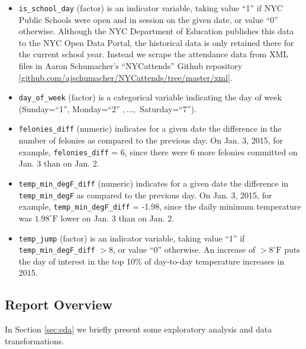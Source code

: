 \documentclass[11pt,notitlepage]{article}
\newcommand{\degf}{^\circ\text{F}}
\begin{document}
\begin{itemize}
\item \texttt{is_school_day} (factor) is an indicator variable, taking value ``1'' if NYC Public Schools were open and in session on the given date, or value ``0'' otherwise. Although the NYC Department of Education publishes this data to the NYC Open Data Portal, the historical data is only retained there for the current school year. Instead we scrape the attendance data from XML files in Aaron Schumacher's ``NYCattends'' Github repository [\href{https://github.com/ajschumacher/NYCattends/tree/master/xml}{github.com/ajschumacher/NYCattends/tree/master/xml}].


\item \texttt{day_of_week} (factor) is a categorical variable indicating the day of week (Sunday=``1'', Monday=``2'' $, \ldots, $ Saturday=``7''). 

\item \texttt{felonies_diff} (numeric) indicates for a given date the difference in the number of felonies as compared to the previous day. On Jan. 3, 2015, for example, \texttt{felonies_diff} = 6, since there were 6 more felonies committed on Jan. 3 than on Jan. 2.

\item \texttt{temp_min_degF_diff} (numeric) indicates for a given date the difference in \texttt{temp_min_degF} as compared to the previous day. On Jan. 3, 2015, for example, \texttt{temp_min_degF_diff} = -1.98, since the daily minimum temperature was $1.98 \degf$ lower on Jan. 3 than on Jan. 2.

\item \texttt{temp_jump} (factor) is an indicator variable, taking value ``1'' if \texttt{temp_min_degF_diff} $> 8$, or value ``0'' otherwise. An increase of $> 8 \degf$ puts the day of interest in the top 10\% of day-to-day temperature increases in 2015.

\vspace*{-3mm}
\end{itemize}



\subsection{Report Overview}

In Section \ref{sec:eda} we briefly present some exploratory analysis and data transformations.
\end{document}

